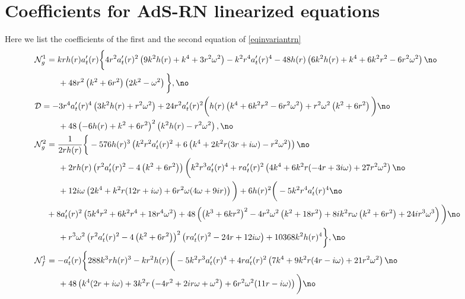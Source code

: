 \documentclass[preprintnumbers,aps,prd,longbibliography,nofootinbib,nobibnotes,amsmath,amssymb]{revtex4}
\begin{document}
\section{Coefficients for AdS-RN linearized equations}\label{Appendix2}
 Here we list the coefficients of the first and the second equation of \eqref{eqinvariantrn}
\begin{align}
	&\hspace{-1cm}\mathcal{N}_g^1 =  k r h(r) a_t'(r) \bigg\{4 r^2 a_t'(r)^2 \left(9 k^2 h(r)+k^4+3 r^2 \omega ^2\right)-k^2 r^4 a_t'(r)^4-48 h(r) \left(6 k^2 h(r)+k^4+6 k^2 r^2-6 r^2 \omega ^2\right)\no\\
	&+48 r^2 \left(k^2+6 r^2\right) \left(2 k^2-\omega ^2\right)\bigg\},\no\\
		&\hspace{-1cm}\mathcal{D} =  -3 r^4 a_t'(r)^4 \left(3 k^2 h(r)+r^2 \omega ^2\right)+24 r^2 a_t'(r)^2 \bigg(h(r) \left(k^4+6 k^2 r^2-6 r^2 \omega ^2\right)+r^2 \omega ^2 \left(k^2+6 r^2\right)\bigg)\no\\
		&+48 \left(-6 h(r)+k^2+6 r^2\right)^2 \left(k^2 h(r)-r^2 \omega ^2\right) ,\no\\
		&\hspace{-1cm}\mathcal{N}_g^2  = \frac{1}{2 r h(r)} \bigg\{-576 h(r)^3 \left(k^2 r^2 a_t'(r)^2+6 \left(k^4+2 k^2 r (3 r+i \omega )-r^2 \omega ^2\right)\right)\no\\
		&+2 r h(r) \left(r^2 a_t'(r)^2-4 \left(k^2+6 r^2\right)\right) \bigg(k^2 r^3 a_t'(r)^4+r a_t'(r)^2 \left(4 k^4+6 k^2 r (-4 r+3 i \omega )+27 r^2 \omega ^2\right)\no\\
		&+12 i \omega  \left(2 k^4+k^2 r (12 r+i \omega )+6 r^2 \omega  (4 \omega +9 i r)\right)\bigg)+6 h(r)^2 \bigg(-5 k^2 r^4 a_t'(r)^4\no\\
		&\hspace{-0.5cm}+8 a_t'(r)^2 \left(5 k^4 r^2+6 k^2 r^4+18 r^4 \omega ^2\right)+48 \left(\left(k^3+6 k r^2\right)^2-4 r^2 \omega ^2 \left(k^2+18 r^2\right)+8 i k^2 r \omega  \left(k^2+6 r^2\right)+24 i r^3 \omega ^3\right)\bigg)\no\\
		&+r^3 \omega ^2 \left(r^2 a_t'(r)^2-4 \left(k^2+6 r^2\right)\right)^2 \left(r a_t'(r)^2-24 r+12 i \omega \right)+10368 k^2 h(r)^4\bigg\},\no\\
	&\hspace{-1cm}\mathcal{N}_f^1  =  -a_t'(r) \bigg\{288 k^3 r h(r)^3 - k r^2 h(r)  \bigg(-5 k^2 r^3 a_t'(r)^4+4 r a_t'(r)^2 \left(7 k^4+9 k^2 r (4 r-i \omega )+21 r^2 \omega ^2\right)\no\\
	&+48 \left(k^4 (2 r+i \omega )+3 k^2 r \left(-4 r^2+2 i r \omega +\omega ^2\right)+6 r^2 \omega ^2 (11 r-i \omega )\right)\bigg)\no\\

\end{align}
\end{document}
